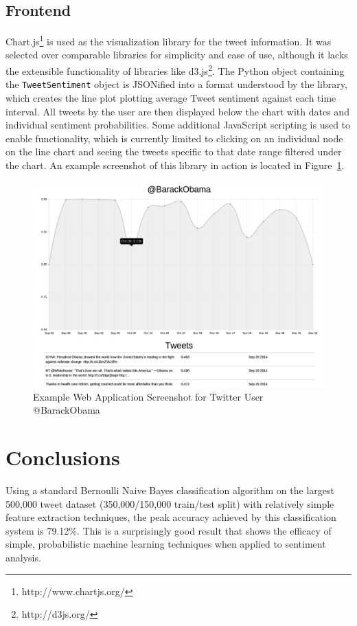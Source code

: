 \documentclass[letter,12pt]{article}
\begin{document}
\subsection{Frontend}

Chart.js\footnote{http://www.chartjs.org/} is used as the visualization library
for the tweet information. It was selected over comparable libraries for
simplicity and ease of use, although it lacks the extensible functionality of
libraries like d3.js\footnote{http://d3js.org/}. The Python object containing
the \texttt{TweetSentiment} object is JSONified into a format understood by the
library, which creates the line plot plotting average Tweet sentiment against
each time interval. All tweets by the user are then displayed below the chart
with dates and individual sentiment probabilities. Some additional JavaScript
scripting is used to enable functionality, which is currently limited to
clicking on an individual node on the line chart and seeing the tweets specific
to that date range filtered under the chart. An example screenshot of this
library in action is located in Figure~\ref{fig:obama}.

\begin{figure}[h]
  \centering
  \includegraphics[width=0.8\linewidth]{img/obama_example_usage.png}
  \caption{Example Web Application Screenshot for Twitter User @BarackObama}
  \label{fig:obama}
\end{figure}

\section{Conclusions}

Using a standard Bernoulli Naive Bayes classification algorithm on the largest
500,000 tweet dataset (350,000/150,000 train/test split) with relatively simple
feature extraction techniques, the peak accuracy achieved by this
classification system is 79.12\%. This is a surprisingly good result that shows
the efficacy of simple, probabilistic machine learning techniques when applied
to sentiment analysis.
\end{document}
